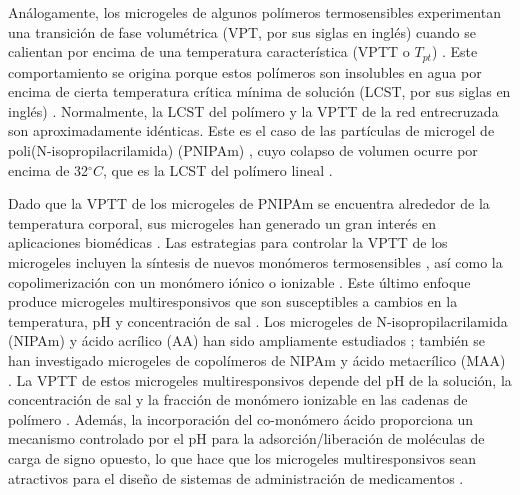 An\'alogamente, los microgeles de algunos pol\'imeros termosensibles experimentan una transici\'on de fase volum\'etrica (VPT, por sus siglas en ingl\'es) cuando se calientan por encima de una temperatura caracter\'istica (VPTT o $T_{pt}$) \cite{Pelton1986,Pelton2000}.
Este comportamiento se origina porque estos pol\'imeros son insolubles en agua por encima de cierta temperatura cr\'itica m\'inima  de soluci\'on (LCST, por sus siglas en ingl\'es) \cite{Kawaguchi2020}.
Normalmente, la LCST del pol\'imero y la VPTT de la red entrecruzada son aproximadamente id\'enticas.
Este es el caso de las part\'iculas de microgel de poli(N-isopropilacrilamida) (PNIPAm) \cite{Pelton1986}, cuyo colapso de volumen ocurre por encima de  32$^\circ C$, que es la LCST del pol\'imero lineal \cite{Schild1992}.

Dado que la VPTT de los microgeles de PNIPAm se encuentra alrededor de la temperatura corporal, sus microgeles han generado un gran inter\'es en aplicaciones biom\'edicas \cite{Guan2011}.
Las estrategias para controlar la VPTT de los microgeles incluyen la s\'intesis de nuevos mon\'omeros termosensibles \cite{Cai2007,Macchione2019}, as\'i como la copolimerizaci\'on con un mon\'omero i\'onico o ionizable \cite{Hirose1987,Lopez2020}.
Este \'ultimo enfoque produce microgeles multiresponsivos que son susceptibles a cambios en la temperatura, pH y concentraci\'on de sal \cite{snowden1996colloidal,Farooqi2017}.
Los microgeles de N-isopropilacrilamida (NIPAm) y \'acido acr\'ilico (AA) han sido ampliamente estudiados \cite{Morris1997,Jones2000,Bradley2005,Begum2016}; tambi\'en se han investigado microgeles de copol\'imeros de NIPAm y \'acido metacr\'ilico (MAA) \cite{Dowding2000,Hoare2004,Giussi2015}.
La VPTT de estos microgeles multiresponsivos depende del pH de la soluci\'on, la concentraci\'on de sal y la fracci\'on de mon\'omero ionizable en las cadenas de pol\'imero \cite{Morris1997,Jones2000,Hoare2004,Bradley2005,Lee2008,Wong2009,Hamzavi2016}.
Adem\'as, la incorporaci\'on del co-mon\'omero \'acido proporciona un mecanismo controlado por el pH para la adsorci\'on/liberaci\'on de mol\'eculas de carga de signo opuesto, lo que hace que los microgeles multiresponsivos sean atractivos para el dise\~no de sistemas de administraci\'on de medicamentos \cite{Liu2017}.

